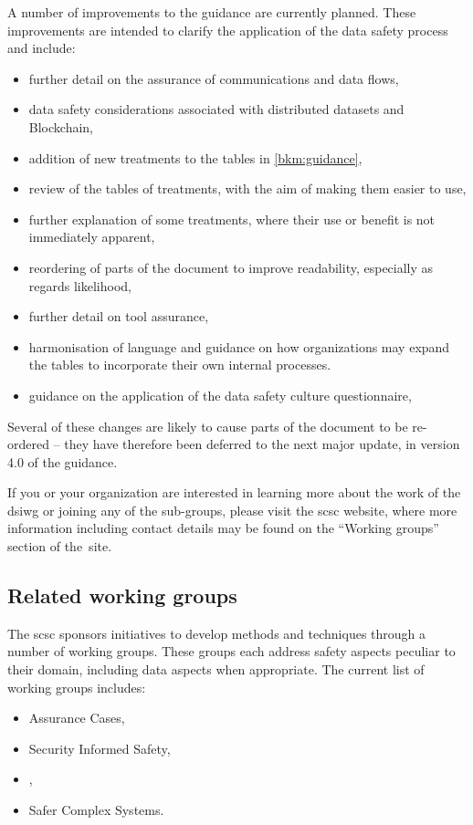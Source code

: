 A number of improvements to the guidance are currently planned.
These improvements are intended to clarify the application of the data safety process
and include:
\begin{itemize}
	\item further detail on the assurance of communications and data flows,
	\item data safety considerations associated with distributed \glspl{dataset} and Blockchain,
	\item addition of new \glspl{treatment} to the tables in \autoref{bkm:guidance},
	\item review of the tables of \glspl{treatment}, with the aim of making them easier to use,
	\item further explanation of some \glspl{treatment}, where their use or benefit is not immediately apparent, 
	\item reordering of parts of the document to improve readability, especially as regards likelihood, 
	\item further detail on tool assurance,
	\item harmonisation of language and guidance on how organizations may expand the tables to incorporate their own internal processes.
	\item guidance on the application of the data safety culture questionnaire,
\end{itemize}
Several of these changes are likely to
cause parts of the document to be re-ordered -- they have therefore been deferred to the next major update, in version 4.0 of the guidance.

If you or your organization are interested in learning more about the work of the \gls{dsiwg} or joining any of the sub-groups,
please visit the \gls{scsc} website, where more information including contact details may be found on the ``Working groups'' section of the\cbstart\ site.\cbend
%
%
%
\subsection*{Related working groups}
\cbstart The \gls{scsc} sponsors initiatives to develop methods and techniques through a number of working groups. These groups each address safety aspects peculiar to their domain, including data aspects when appropriate. The current list of working groups includes:
%
\begin{itemize}
	\item Assurance Cases,
	\cbstart  \item Security Informed Safety,\cbend
	\item {},
	\item Safer Complex Systems. 
\end{itemize}
%
\cbend
%
\clearpage
%

